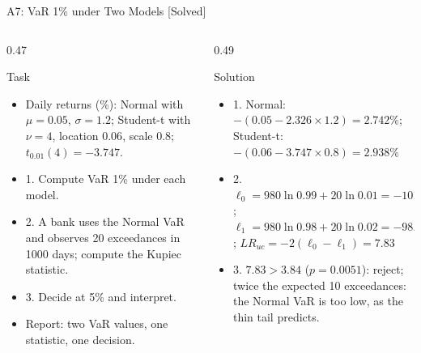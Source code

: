 \begin{frame}{A7: VaR 1\% under Two Models [Solved]}
\itemsize{\scriptsize}
\begin{columns}[T]
\begin{column}{0.47\textwidth}
\begin{block}{Task}
\begin{itemize}
    \item Daily returns (\%): Normal with $\mu = 0.05$, $\sigma = 1.2$; Student-t with $\nu = 4$, location $0.06$, scale $0.8$; $t_{0.01}(4) = -3.747$.
    \item 1. Compute VaR 1\% under each model.
    \item 2. A bank uses the Normal VaR and observes 20 exceedances in 1000 days; compute the Kupiec statistic.
    \item 3. Decide at 5\% and interpret.
    \item Report: two VaR values, one statistic, one decision.
\end{itemize}
\end{block}
\end{column}
\begin{column}{0.49\textwidth}
\begin{exampleblock}{Solution}
\begin{itemize}
    \item 1. Normal: $-(0.05 - 2.326 \times 1.2) = 2.742\%$; Student-t: $-(0.06 - 3.747 \times 0.8) = 2.938\%$
    \item 2. $\ell_0 = 980\ln 0.99 + 20\ln 0.01 = -101.95$; $\ell_1 = 980\ln 0.98 + 20\ln 0.02 = -98.04$; $LR_{uc} = -2(\ell_0 - \ell_1) = 7.83$
    \item 3. $7.83 > 3.84$ ($p = 0.0051$): reject; twice the expected 10 exceedances: the Normal VaR is too low, as the thin tail predicts.
\end{itemize}
\end{exampleblock}
\end{column}
\end{columns}
\end{frame}


